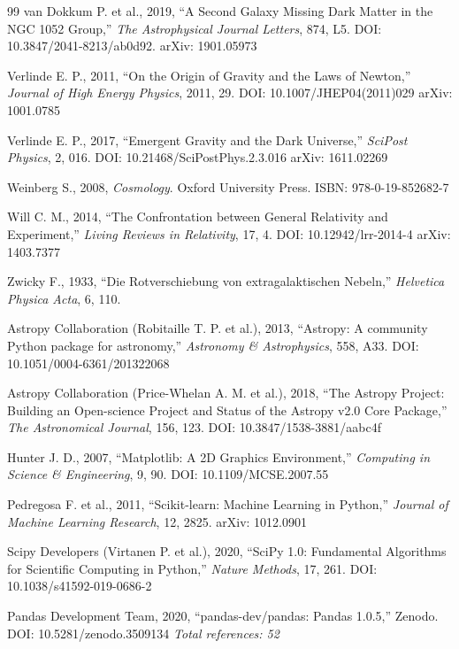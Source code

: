 \documentclass[10pt,a4paper]{article}
\begin{document}
\begin{thebibliography}{99}
van Dokkum P. et al., 2019, ``A Second Galaxy Missing Dark Matter in the NGC 1052 Group,'' \emph{The Astrophysical Journal Letters}, 874, L5. DOI: 10.3847/2041-8213/ab0d92. arXiv: 1901.05973

Verlinde E. P., 2011, ``On the Origin of Gravity and the Laws of Newton,'' \emph{Journal of High Energy Physics}, 2011, 29. DOI: 10.1007/JHEP04(2011)029 arXiv: 1001.0785

Verlinde E. P., 2017, ``Emergent Gravity and the Dark Universe,'' \emph{SciPost Physics}, 2, 016. DOI: 10.21468/SciPostPhys.2.3.016 arXiv: 1611.02269


Weinberg S., 2008, \emph{Cosmology}. Oxford University Press. ISBN: 978-0-19-852682-7

Will C. M., 2014, ``The Confrontation between General Relativity and Experiment,'' \emph{Living Reviews in Relativity}, 17, 4. DOI: 10.12942/lrr-2014-4 arXiv: 1403.7377

Zwicky F., 1933, ``Die Rotverschiebung von extragalaktischen Nebeln,'' \emph{Helvetica Physica Acta}, 6, 110.

Astropy Collaboration (Robitaille T. P. et al.), 2013, ``Astropy: A community Python package for astronomy,'' \emph{Astronomy \& Astrophysics}, 558, A33. DOI: 10.1051/0004-6361/201322068

Astropy Collaboration (Price-Whelan A. M. et al.), 2018, ``The Astropy Project: Building an Open-science Project and Status of the Astropy v2.0 Core Package,'' \emph{The Astronomical Journal}, 156, 123. DOI: 10.3847/1538-3881/aabc4f

Hunter J. D., 2007, ``Matplotlib: A 2D Graphics Environment,'' \emph{Computing in Science \& Engineering}, 9, 90. DOI: 10.1109/MCSE.2007.55

Pedregosa F. et al., 2011, ``Scikit-learn: Machine Learning in Python,'' \emph{Journal of Machine Learning Research}, 12, 2825. arXiv: 1012.0901

Scipy Developers (Virtanen P. et al.), 2020, ``SciPy 1.0: Fundamental Algorithms for Scientific Computing in Python,'' \emph{Nature Methods}, 17, 261. DOI: 10.1038/s41592-019-0686-2

Pandas Development Team, 2020, ``pandas-dev/pandas: Pandas 1.0.5,'' Zenodo. DOI: 10.5281/zenodo.3509134 \emph{Total references: 52}




\end{thebibliography}
\end{document}
